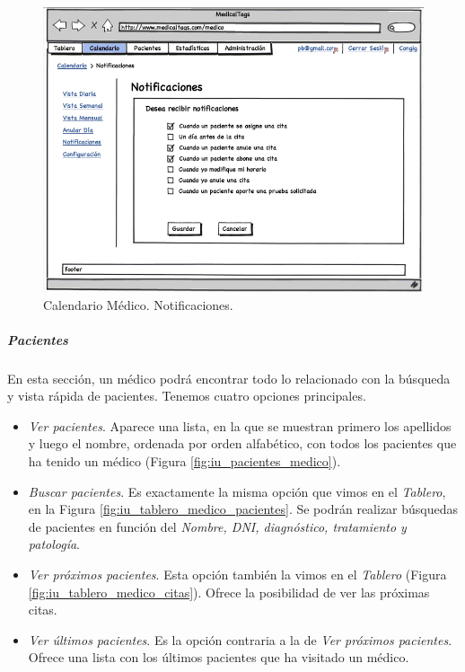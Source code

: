 			
			\begin{figure}[H]
			  \centering
			    \includegraphics[width=12cm]{img/png/interfaz/16_Calendario_Medico_Notificaciones.png}
			  \caption{Calendario Médico. Notificaciones.}
			  \label{fig:iu_calendario_notificaciones}
			\end{figure}
			
			
		
		
		\subparagraph{Pacientes} %
		\label{par:medico_pacientes}
		
		En esta sección, un médico podrá encontrar todo lo relacionado con la búsqueda y vista rápida de pacientes.	Tenemos cuatro opciones principales.
		
		\begin{itemize}
			\item \textit{Ver pacientes}. Aparece una lista, en la que se muestran primero los apellidos y luego el nombre, ordenada por orden alfabético, con todos los pacientes que ha tenido un médico (Figura \ref{fig:iu_pacientes_medico}).
			\item \textit{Buscar pacientes}. Es exactamente la misma opción que vimos en el \textit{Tablero}, en la Figura \ref{fig:iu_tablero_medico_pacientes}. Se podrán realizar búsquedas de pacientes en función del \textit{Nombre, DNI, diagnóstico, tratamiento y patología}.
			\item \textit{Ver próximos pacientes}. Esta opción también la vimos en el \textit{Tablero} (Figura \ref{fig:iu_tablero_medico_citas}). Ofrece la posibilidad de ver las próximas citas.
			\item \textit{Ver últimos pacientes}. Es la opción contraria a la de \textit{Ver próximos pacientes}. Ofrece una lista con los últimos pacientes que ha visitado un médico. 
		\end{itemize}
			

